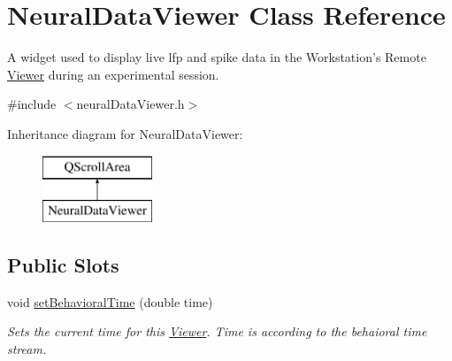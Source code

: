\hypertarget{class_neural_data_viewer}{\section{Neural\-Data\-Viewer Class Reference}
\label{class_neural_data_viewer}
}


A widget used to display live lfp and spike data in the Workstation's Remote \hyperlink{class_viewer}{Viewer} during an experimental session.  




{\ttfamily \#include $<$neural\-Data\-Viewer.\-h$>$}

Inheritance diagram for Neural\-Data\-Viewer\-:\begin{figure}[H]
\begin{center}
\leavevmode
\includegraphics[height=2.000000cm]{class_neural_data_viewer}
\end{center}
\end{figure}
\subsection*{Public Slots}
\begin{DoxyCompactItemize}
\item 
\hypertarget{class_neural_data_viewer_a2ca4a819f8149a661a30bb1fe64f455c}{void \hyperlink{class_neural_data_viewer_a2ca4a819f8149a661a30bb1fe64f455c}{set\-Behavioral\-Time} (double time)}\label{class_neural_data_viewer_a2ca4a819f8149a661a30bb1fe64f455c}

\begin{DoxyCompactList}\small\item\em Sets the current time for this \hyperlink{class_viewer}{Viewer}. Time is according to the behaioral time stream. \end{DoxyCompactList}\end{DoxyCompactItemize}
